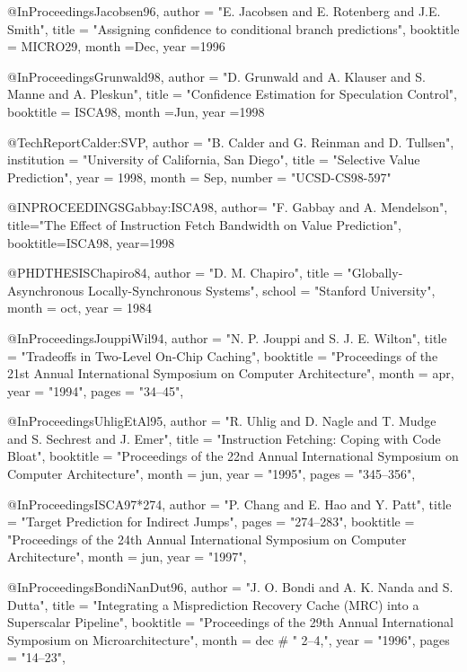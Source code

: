 @InProceedings{Jacobsen96,
  author =       "E. Jacobsen and E. Rotenberg and J.E. Smith",
  title =        "Assigning confidence to conditional branch predictions",
  booktitle =    MICRO29,
  month           =Dec,
  year            =1996
}

@InProceedings{Grunwald98,
  author =       "D. Grunwald and A. Klauser and S. Manne and A. Pleskun",
  title =        "Confidence Estimation for Speculation Control",
  booktitle =    ISCA98,
  month           =Jun,
  year            =1998
}



@TechReport{Calder:SVP,
  author =       "B. Calder and G. Reinman and D. Tullsen",
  institution =  "University of California, San Diego",
  title =        "Selective Value Prediction",
  year =         1998,
  month =        Sep,
  number =       "UCSD-CS98-597"
}


@INPROCEEDINGS{Gabbay:ISCA98,
  author= "F. Gabbay and A. Mendelson",
  title="The Effect of Instruction Fetch Bandwidth on Value Prediction",
  booktitle=ISCA98,
  year=1998
}

@PHDTHESIS{Chapiro84,
  author = "D. M. Chapiro",
  title  = "Globally-Asynchronous Locally-Synchronous Systems",
  school = "Stanford University",
  month  = oct,
  year   = 1984 }

@InProceedings{JouppiWil94,
  author =       "N. P. Jouppi and S. J. E. Wilton",
  title =        "Tradeoffs in Two-Level On-Chip Caching",
  booktitle =    "Proceedings of the 21st Annual International Symposium
                 on Computer Architecture",
  month =        apr,
  year =         "1994",
  pages =        "34--45",
}

@InProceedings{UhligEtAl95,
  author =       "R. Uhlig and D. Nagle and T. Mudge and
                 S. Sechrest and J. Emer",
  title =        "Instruction Fetching: Coping with Code Bloat",
  booktitle =    "Proceedings of the 22nd Annual International Symposium
                 on Computer Architecture",
  month =        jun,
  year =         "1995",
  pages =        "345--356",
}

@InProceedings{ISCA97*274,
  author =       "P. Chang and E. Hao and Y. Patt",
  title =        "Target Prediction for Indirect Jumps",
  pages =        "274--283",
  booktitle =    "Proceedings of the 24th Annual International Symposium
                 on Computer Architecture",
  month =        jun,
  year =         "1997",
}

@InProceedings{BondiNanDut96,
  author =       "J. O. Bondi and A. K. Nanda and S.
                 Dutta",
  title =        "Integrating a Misprediction Recovery Cache {(MRC)}
                 into a Superscalar Pipeline",
  booktitle =    "Proceedings of the 29th Annual International Symposium
                 on Microarchitecture",
  month =        dec # " 2--4,",
  year =         "1996",
  pages =        "14--23",
}


